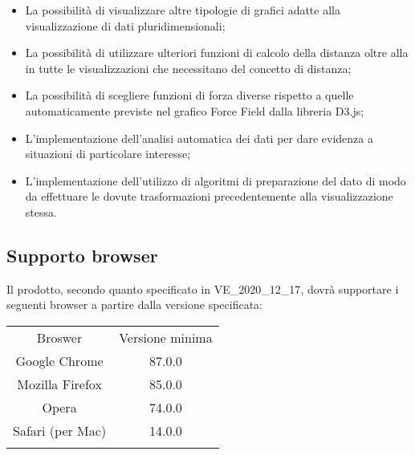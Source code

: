 \documentclass[../analisi-dei-requisiti.tex]{subfiles}
\begin{document}
\begin{itemize}
    \item La possibilità di visualizzare altre tipologie di grafici adatte alla visualizzazione di dati
    pluridimensionali;
    \item La possibilità di utilizzare ulteriori funzioni di calcolo della distanza oltre alla
     in tutte le visualizzazioni che necessitano del concetto di distanza;
    \item La possibilità di scegliere funzioni di forza diverse rispetto a quelle automaticamente previste nel grafico
    Force Field dalla libreria D3.js;
    \item L'implementazione dell'analisi automatica dei dati per dare evidenza a situazioni di particolare interesse;
    \item L'implementazione dell'utilizzo di algoritmi di preparazione del dato di modo da effettuare le dovute
    trasformazioni precedentemente alla visualizzazione stessa.
\end{itemize}

\subsection{Supporto browser}
\label{sub:supporto_browser}



Il prodotto, secondo quanto specificato in \textsc{VE\_2020\_12\_17}, dovrà supportare i seguenti browser a partire dalla versione specificata:

\renewcommand{\arraystretch}{2} %
\begin{tabular}{|c|c|}

    \hline
    \rowcolor{lightgray}
	
	Broswer & Versione minima\\
	Google Chrome & 87.0.0 \\
	Mozilla Firefox & 85.0.0\\
	Opera & 74.0.0 \\
	Safari (per Mac) & 14.0.0\\
	
    \hline
    \rowcolor{white}
\end{tabular}
\end{document}
